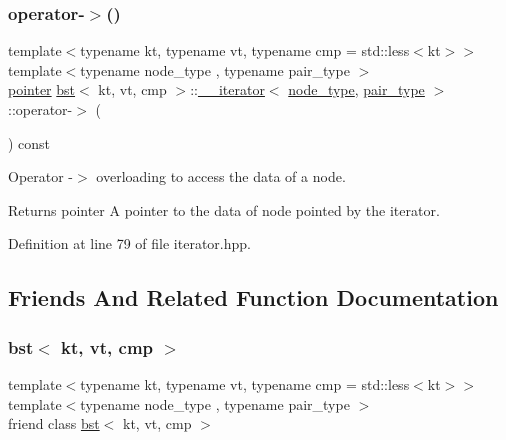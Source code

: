 \subsubsection{\texorpdfstring{operator-\/$>$()}{operator->()}}
{\footnotesize\ttfamily template$<$typename kt, typename vt, typename cmp = std\+::less$<$kt$>$$>$ \\
template$<$typename node\+\_\+type , typename pair\+\_\+type $>$ \\
\hyperlink{classbst_1_1____iterator_adb4d1d8f8048f7036ff5ac383ea9c649}{pointer} \hyperlink{classbst}{bst}$<$ kt, vt, cmp $>$\+::\hyperlink{classbst_1_1____iterator}{\+\_\+\+\_\+iterator}$<$ \hyperlink{classbst_a062eb2a1ac54802dbc4f0f74ae2afd01}{node\+\_\+type}, \hyperlink{classbst_a7b11cca2a3b4394915600194f741ab16}{pair\+\_\+type} $>$\+::operator-\/$>$ (\begin{DoxyParamCaption}{ }\end{DoxyParamCaption}) const\hspace{0.3cm}{\ttfamily [inline]}}



Operator -\/$>$ overloading to access the data of a node. 

\begin{DoxyReturn}{Returns}
pointer A pointer to the data of node pointed by the iterator. 
\end{DoxyReturn}


Definition at line 79 of file iterator.\+hpp.



\subsection{Friends And Related Function Documentation}
\mbox{\label{classbst_1_1____iterator_a7aa3d08ff37cace553bd05620c22f924}} 
\subsubsection{\texorpdfstring{bst$<$ kt, vt, cmp $>$}{bst< kt, vt, cmp >}}
{\footnotesize\ttfamily template$<$typename kt, typename vt, typename cmp = std\+::less$<$kt$>$$>$ \\
template$<$typename node\+\_\+type , typename pair\+\_\+type $>$ \\
friend class \hyperlink{classbst}{bst}$<$ kt, vt, cmp $>$\hspace{0.3cm}{\ttfamily [friend]}}

